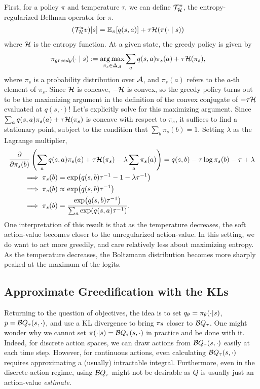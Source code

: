 \documentclass[\main/thesis.tex]{subfiles}
\begin{document}
First, for a policy $\pi$ and temperature $\tau$, we can define $\mathcal{T}^\pi_{\mathcal{H}}$, the entropy-regularized Bellman operator for $\pi$. 
\begin{align*}
    (\mathcal{T}^\pi_{\mathcal{H}} v)[s] &= \mathbb{E}_\pi[q(s, a)] + \tau \mathcal{H}(\pi(\cdot \mid s))
\end{align*}
where $\mathcal{H}$ is the entropy function. At a given state, the greedy policy is given by 
\begin{align*}
    \pi_{greedy}(\cdot \mid s) &:= \operatorname*{arg\,max}_{\pi_s \in \Delta_{\mathcal{A}}} \sum_a q(s, a) \pi_s(a) + \tau \mathcal{H}(\pi_s),
\end{align*}
where $\pi_s$ is a probability distribution over $\mathcal{A}$, and $\pi_s(a)$ refers to the $a$-th element of $\pi_s$. Since $\mathcal{H}$ is concave, $-\mathcal{H}$ is convex, so the greedy policy turns out to be the maximizing argument in the definition of the convex conjugate of $-\tau \mathcal{H}$ evaluated at $q(s, \cdot)$! Let's explicitly solve for this maximizing argument. Since $\sum_a q(s, a) \pi_s(a) + \tau \mathcal{H}(\pi_s)$ is concave with respect to $\pi_s$, it suffices to find a stationary point, subject to the condition that $\sum_b \pi_s(b) = 1$. Setting $\lambda$ as the Lagrange multiplier,
\begin{align*}
    &\pdv{}{\pi_s(b)} \left(\sum_a q(s, a) \pi_s(a) + \tau \mathcal{H}(\pi_s)- \lambda \sum_a \pi_s(a)\right) = q(s, b) - \tau \log\pi_s(b) - \tau  + \lambda \\
    &\quad\quad\implies \pi_s(b) = \exp(q(s, b)\tau^{-1} - 1 - \lambda \tau^{-1})\\
    &\quad\quad\implies \pi_s(b) \propto \exp(q(s, b) \tau^{-1})\\
    &\quad\quad\implies \pi_s(b) = \frac{\exp(q(s, b)\tau^{-1})}{\sum_a \exp(q(s, a) \tau^{-1})}.
\end{align*}
One interpretation of this result is that as the temperature decreases, the soft action-value becomes closer to the unregularized action-value. In this setting, we do want to act more greedily, and care relatively less about maximizing entropy. As the temperature decreases, the Boltzmann distribution becomes more sharply peaked at the maximum of the logits. 

\subsection{Approximate Greedification with the KLs}

Returning to the question of objectives, the idea is to set $q_\theta = \pi_\theta(\cdot | s)$, $p =  \mathcal{B}Q_\tau(s, \cdot)$, and use a KL divergence to bring $\pi_\theta$ closer to $\mathcal{B}Q_\tau$. One might wonder why we cannot set $\pi(\cdot | s) = \mathcal{B}Q_\tau(s, \cdot)$ in practice and be done with it. Indeed, for discrete action spaces, we can draw actions from $\mathcal{B}Q_\tau(s, \cdot)$ easily at each time step. However, for continuous actions, even calculating $\mathcal{B}Q_\tau(s, \cdot)$ requires approximating a (usually) intractable integral. Furthermore, even in the discrete-action regime, using $\mathcal{B}Q_\tau$ might not be desirable as $Q$ is usually just an action-value \textit{estimate}. 
\end{document}
